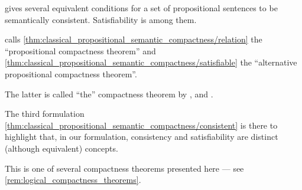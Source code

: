 \begin{comments}
  \item {} gives several equivalent conditions for a set of propositional sentences to be semantically consistent. Satisfiability is among them.

  \item \Textcite*[47]{Hinman2005Logic} calls \cref{thm:classical_propositional_semantic_compactness/relation} the \enquote{propositional compactness theorem} and \cref{thm:classical_propositional_semantic_compactness/satisfiable} the \enquote{alternative propositional compactness theorem}.

  The latter is called \enquote{the} compactness theorem by \cite[exerc. 1.5.8]{VanDalen2004LogicAndStructure}, \cite[thm 1.3.23]{Герасимов2014Вычислимость} and \cite[thm. 21]{ШеньВерещагин2017ЯзыкиИИсчисления}.

  The third formulation \cref{thm:classical_propositional_semantic_compactness/consistent} is there to highlight that, in our formulation, consistency and satisfiability are distinct (although equivalent) concepts.

  \item This is one of several compactness theorems presented here --- see \cref{rem:logical_compactness_theorems}.
\end{comments}
